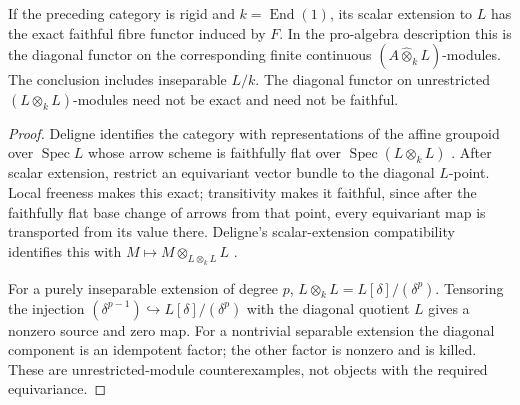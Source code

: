 \begin{proposition}\label{prop:restricted-diagonal-fibre-functor}
If the preceding category is rigid and $k=\operatorname{End}(1)$,
its scalar extension to $L$ has the exact faithful fibre functor
induced by $F$. In the pro-algebra description this is the diagonal
functor on the corresponding finite continuous
$(A\widehat\otimes_kL)$-modules. The conclusion includes inseparable
$L/k$. The diagonal functor on unrestricted
$(L\otimes_kL)$-modules need not be exact and need not be faithful.
\end{proposition}
\begin{proof}
Deligne identifies the category with representations of the affine
groupoid over $\operatorname{Spec}L$ whose arrow scheme is faithfully
flat over $\operatorname{Spec}(L\otimes_kL)$
\cite[Theorem~1.12]{Deligne1990}. After scalar extension, restrict
an equivariant vector bundle to the diagonal $L$-point. Local
freeness makes this exact; transitivity makes it faithful, since
after the faithfully flat base change of arrows from that point,
every equivariant map is transported from its value there.
Deligne's scalar-extension compatibility identifies this with
$M\mapsto M\otimes_{L\otimes_kL}L$
\cite[5.18--5.21]{Deligne1990}.

For a purely inseparable extension of degree $p$,
$L\otimes_kL=L[\delta]/(\delta^p)$. Tensoring the injection
$(\delta^{p-1})\hookrightarrow L[\delta]/(\delta^p)$ with the
diagonal quotient $L$ gives a nonzero source and zero map.
For a nontrivial separable extension the diagonal component is an
idempotent factor; the other factor is nonzero and is killed.
These are unrestricted-module counterexamples, not objects with
the required equivariance.
\end{proof}

